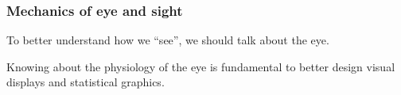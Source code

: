 \documentclass[12pt]{beamer}\usepackage[]{graphicx}\usepackage[]{color}
\begin{document}

\begin{frame}
\begin{center}
\Huge{}
\end{center}
\end{frame}


{ %
    \begin{frame}[plain]
     \end{frame}
}


\begin{frame}
\frametitle{Mechanics of eye and sight}

\bbi
  \item To better understand how we ``see'', we should talk about the eye.
  \item Knowing about the physiology of the eye is fundamental to better
  design visual displays and statistical graphics.
\ei

\end{frame}

\end{document}
